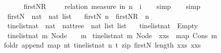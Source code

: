 \begin{isabellebody}
\endisadelimproof
\ \ \ \ \isanewline
{}\isamarkupfalse%
\ firstN{\isacharunderscore}R\ \isanewline
%
\isadelimproof
\ \ %
\endisadelimproof
%
\isatagproof
{}\isamarkupfalse%
\ {\isacharparenleft}relation\ {\isachardoublequoteopen}measure\ {\isacharparenleft}{\isasymlambda}{\isacharparenleft}i{\isacharcomma}n{\isacharparenright}{\isachardot}\ n\ {\isacharminus}\ i{\isacharparenright}{\isachardoublequoteclose}{\isacharparenright}\isanewline
\ \ \isamarkupfalse%
\ simp\isanewline
\ \ \isamarkupfalse%
\ simp%
\endisatagproof
{\isafoldproof}%
%
\isadelimproof
\ \ \isanewline
%
\endisadelimproof
\ \ \isanewline
{}\isamarkupfalse%
\ firstN\ {\isacharcolon}{\isacharcolon}\ {\isachardoublequoteopen}nat\ {\isasymRightarrow}\ nat\ list{\isachardoublequoteclose}\ \isanewline
\ \ {\isachardoublequoteopen}firstN\ n\ {\isacharequal}\ firstN{\isacharunderscore}R\ {}\ n{\isachardoublequoteclose}\ \isanewline
\ \ \ \ \isanewline
{}\isamarkupfalse%
\ tinelist{\isacharunderscore}nat\ {\isacharcolon}{\isacharcolon}\ {\isachardoublequoteopen}nat\ {\isasymRightarrow}\ nattree\ {\isasymRightarrow}\ {\isacharparenleft}nat\ list{\isacharparenright}\ list{\isachardoublequoteclose}\ \isanewline
\ \ {\isachardoublequoteopen}tinelist{\isacharunderscore}nat\ {\isacharunderscore}\ Empty\ {\isacharequal}\ {\isacharbrackleft}{\isacharbrackleft}{\isacharbrackright}{\isacharbrackright}{\isachardoublequoteclose}\isanewline
{\isacharbar}\ {\isachardoublequoteopen}tinelist{\isacharunderscore}nat\ m\ {\isacharparenleft}Node\ {\isacharunderscore}\ {\isacharbrackleft}{\isacharbrackright}{\isacharparenright}\ {\isacharequal}\ {\isacharbrackleft}{\isacharbrackleft}m{\isacharbrackright}{\isacharbrackright}{\isachardoublequoteclose}\isanewline
{\isacharbar}\ {\isachardoublequoteopen}tinelist{\isacharunderscore}nat\ m\ {\isacharparenleft}Node\ {\isacharunderscore}\ {\isacharparenleft}x{\isacharhash}xs{\isacharparenright}{\isacharparenright}\ {\isacharequal}\ map\ {\isacharparenleft}Cons\ m{\isacharparenright}\ \isanewline
{\isacharparenleft}foldr\ append\ {\isacharparenleft}map\ {\isacharparenleft}{\isasymlambda}{\isacharparenleft}n{\isacharcomma}t{\isacharparenright}{\isachardot}\ tinelist{\isacharunderscore}nat\ n\ t{\isacharparenright}\ {\isacharparenleft}zip\ {\isacharparenleft}firstN\ {\isacharparenleft}length\ {\isacharparenleft}x{\isacharhash}xs{\isacharparenright}{\isacharparenright}{\isacharparenright}\ {\isacharparenleft}x{\isacharhash}xs{\isacharparenright}{\isacharparenright}{\isacharparenright}\ {\isacharbrackleft}{\isacharbrackright}{\isacharparenright}{\isachardoublequoteclose}\isanewline

\end{isabellebody}
